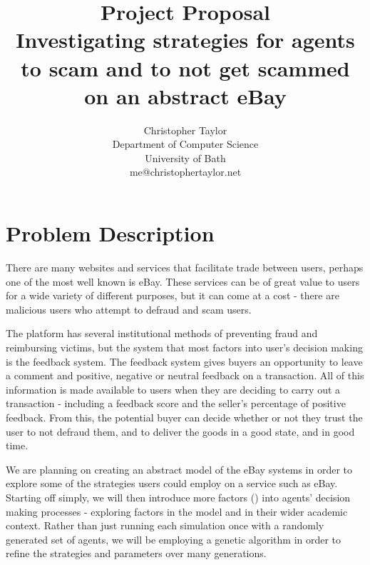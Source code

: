 \documentclass{article}
\title{Project Proposal \\ Investigating strategies for agents to scam and to not get scammed on an abstract eBay}
\author{Christopher Taylor \\ Department of Computer Science \\ University of Bath \\ me@christophertaylor.net}
\begin{document}
\maketitle

\section{Problem Description}
\label{sec:problem-description}
There are many websites and services that facilitate trade between users, perhaps one of the most well known is eBay. These services can be of great value to users for a wide variety of different purposes, but it can come at a cost - there are malicious users who attempt to defraud and scam users.

The platform has several institutional methods of preventing fraud and reimbursing victims, but the system that most factors into user's decision making is the feedback system. The feedback system gives buyers an opportunity to leave a comment and positive, negative or neutral feedback on a transaction. All of this information is made available to users when they are deciding to carry out a transaction - including a feedback score and the seller's percentage of positive feedback. From this, the potential buyer can decide whether or not they trust the user to not defraud them, and to deliver the goods in a good state, and in good time.\cite{gregg2006role}

We are planning on creating an abstract model of the eBay systems in order to explore some of the strategies users could employ on a service such as eBay. Starting off simply, we will then introduce more factors () into agents' decision making processes - exploring factors in the model and in their wider academic context. Rather than just running each simulation once with a randomly generated set of agents, we will be employing a genetic algorithm in order to refine the strategies and parameters over many generations.
\end{document}
